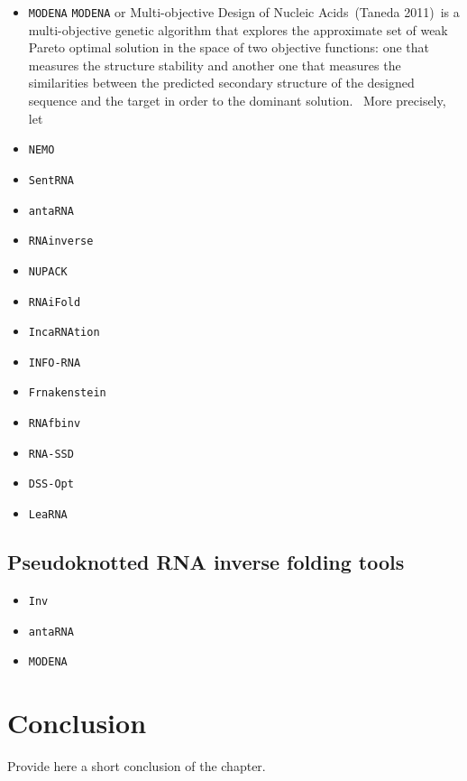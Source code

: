 \begin{itemize}
	\item \texttt{MODENA}
	\texttt{MODENA} or Multi-objective Design of Nucleic Acids (Taneda 2011) is a multi-objective genetic algorithm that explores the approximate set of weak Pareto optimal solution in the space of two objective functions: one that measures the structure stability and another one that measures the similarities between the predicted secondary structure of the designed sequence and the target in order to the dominant solution.  More precisely, let 
	
	\item \texttt{NEMO \cite{nemo2018}}
	\item \texttt{SentRNA} \cite{shi2018sentrna}
	\item \texttt{antaRNA}
	\item \texttt{RNAinverse}
	\item \texttt{NUPACK}
	\item \texttt{RNAiFold}
	\item \texttt{IncaRNAtion}
	\item \texttt{INFO-RNA} 
	\item \texttt{Frnakenstein}
	\item \texttt{RNAfbinv}
	\item \texttt{RNA-SSD}
	\item \texttt{DSS-Opt}
	\item \texttt{LeaRNA}
\end{itemize}

\subsection{Pseudoknotted RNA inverse folding tools}
\begin{itemize}
	\item \texttt{Inv}
	\item \texttt{antaRNA}
	\item \texttt{MODENA}
\end{itemize}
\section{Conclusion}
Provide here a short conclusion of the chapter. 
